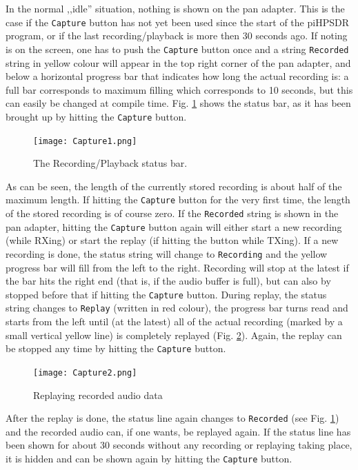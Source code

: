 \documentclass[12pt]{book}
\def\rett#1{\texttt{\color{red}#1}}
\def\bltt#1{\texttt{\color{blue}#1}}
\def\pH{pi\-HPSDR\xspace}
\begin{document}
In the normal ,,idle'' situation, nothing is shown on the pan adapter. This is the case if the \bltt{Capture}
button has not yet been used since the start of the \pH program, or if the last recording/playback is
more then 30 seconds ago. If noting is on the screen, one has to push the \bltt{Capture} button once and
a string \rett{Recorded} string in yellow colour will appear in the top right corner of the pan adapter,
and below a horizontal progress bar that indicates how long the actual recording is: a full bar corresponds
to maximum filling which corresponds to 10 seconds, but this can easily be changed at compile time.
Fig. \ref{fig:capture1} shows the status bar, as it has been brought up by hitting the \bltt{Capture} button.

\begin{figure}[ht]
\center
\texttt{[image: Capture1.png]}
\caption{The Recording/Playback status bar.}
\label{fig:capture1}
\end{figure}

As can be seen, the length of the currently stored recording is about half of the maximum length. If hitting
the \bltt{Capture} button for the very first time, the length of the stored recording is of course zero. If
the \rett{Recorded} string is shown in the pan adapter, hitting the \bltt{Capture} button again will either
start a new recording (while RXing) or start the replay (if hitting the button while TXing).
If a new recording is done, the status string will change to \rett{Recording} and the yellow progress bar
will fill from the left to the right. Recording will stop at the latest if the bar hits the right end
(that is, if the audio buffer is full), but can also by stopped before that if hitting the \bltt{Capture}
button. During replay, the status string changes to \rett{Replay} (written in red colour), the progress bar
turns read and starts from the left until (at the latest) all of the actual recording (marked by a small
vertical yellow line) is completely replayed (Fig. \ref{fig:capture2}). Again, the replay can be stopped any time by hitting
the \bltt{Capture} button.
\begin{figure}[ht]
\center
\texttt{[image: Capture2.png]}
\caption{Replaying recorded audio data}
\label{fig:capture2}
\end{figure}

After the replay is done, the status line again changes to \rett{Recorded} (see Fig. \ref{fig:capture1})
and the recorded audio can, if one wants, be replayed again. If the status line has been shown for about
30 seconds without any recording or replaying taking place, it is hidden and can be shown again by
hitting the \bltt{Capture} button.
\end{document}
